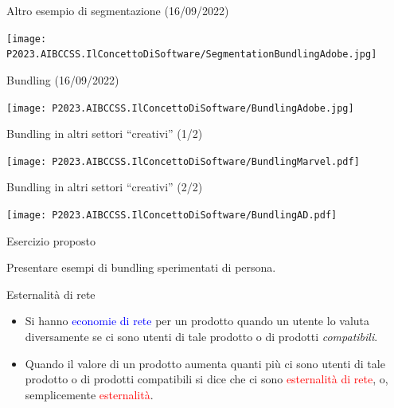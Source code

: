 \documentclass{beamer}
\begin{document}
\begin{frame}
{\centerline{Altro esempio di segmentazione (16/09/2022)}}
\begin{center}
    \texttt{[image: P2023.AIBCCSS.IlConcettoDiSoftware/SegmentationBundlingAdobe.jpg]}
\end{center}

\end{frame}

\begin{frame}
{\centerline{Bundling (16/09/2022)}}
\begin{center}
    \texttt{[image: P2023.AIBCCSS.IlConcettoDiSoftware/BundlingAdobe.jpg]}
\end{center}

\end{frame}

\begin{frame}
{\centerline{Bundling in altri settori ``creativi'' (1/2)}}
\begin{center}
    \texttt{[image: P2023.AIBCCSS.IlConcettoDiSoftware/BundlingMarvel.pdf]}
\end{center}

\end{frame}

\begin{frame}
{\centerline{Bundling in altri settori ``creativi'' (2/2)}}
\begin{center}
    \texttt{[image: P2023.AIBCCSS.IlConcettoDiSoftware/BundlingAD.pdf]}
\end{center}

\end{frame}

\begin{frame}
{\centerline{Esercizio proposto}}
\vspace{1cm}
\begin{center}
    \LARGE{Presentare esempi di bundling sperimentati di persona.}
\end{center}

\end{frame}



\begin{frame}
{\centerline{Esternalit\`{a} di rete}}

\begin{itemize}
\item Si hanno \textcolor{blue}{economie di rete} per un prodotto quando un utente lo valuta  diversamente se ci sono utenti di tale prodotto o di prodotti \textit{compatibili}.

\item Quando il valore di un prodotto aumenta quanti pi\`{u} ci sono utenti di tale prodotto o di prodotti compatibili si dice che ci sono \textcolor{red}{esternalit\`{a} di rete}, o, semplicemente \textcolor{red}{esternalit\`{a}}.


\end{itemize}

\end{frame}
\end{document}
